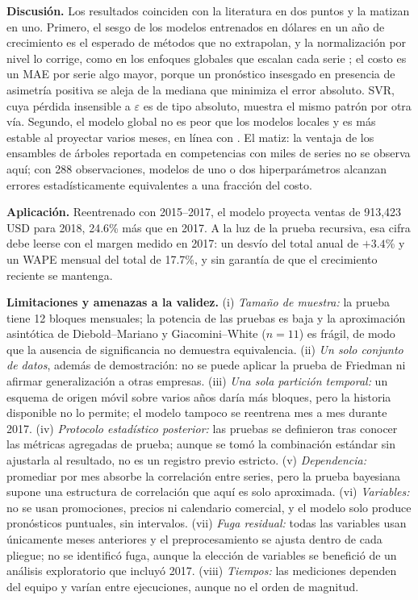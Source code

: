 \documentclass[pdflatex,sn-mathphys-num]{sn-jnl}
\begin{document}
\textbf{Discusión.} Los resultados coinciden con la literatura en dos puntos y la matizan en uno. Primero, el sesgo de los modelos entrenados en dólares en un año de crecimiento es el esperado de métodos que no extrapolan, y la normalización por nivel lo corrige, como en los enfoques globales que escalan cada serie \cite{salinas2020,smyl2020}; el costo es un MAE por serie algo mayor, porque un pronóstico insesgado en presencia de asimetría positiva se aleja de la mediana que minimiza el error absoluto. SVR, cuya pérdida insensible a $\varepsilon$ es de tipo absoluto, muestra el mismo patrón por otra vía. Segundo, el modelo global no es peor que los modelos locales y es más estable al proyectar varios meses, en línea con \cite{monteromanso2021}. El matiz: la ventaja de los ensambles de árboles reportada en competencias con miles de series \cite{makridakis2022} no se observa aquí; con 288 observaciones, modelos de uno o dos hiperparámetros alcanzan errores estadísticamente equivalentes a una fracción del costo.

\textbf{Aplicación.} Reentrenado con 2015--2017, el modelo proyecta ventas de 913{,}423 USD para 2018, 24.6\% más que en 2017. A la luz de la prueba recursiva, esa cifra debe leerse con el margen medido en 2017: un desvío del total anual de $+3.4$\% y un WAPE mensual del total de 17.7\%, y sin garantía de que el crecimiento reciente se mantenga.

\textbf{Limitaciones y amenazas a la validez.} (i) \emph{Tamaño de muestra:} la prueba tiene 12 bloques mensuales; la potencia de las pruebas es baja y la aproximación asintótica de Diebold--Mariano y Giacomini--White ($n=11$) es frágil, de modo que la ausencia de significancia no demuestra equivalencia. (ii) \emph{Un solo conjunto de datos}, además de demostración: no se puede aplicar la prueba de Friedman ni afirmar generalización a otras empresas. (iii) \emph{Una sola partición temporal:} un esquema de origen móvil sobre varios años daría más bloques, pero la historia disponible no lo permite; el modelo tampoco se reentrena mes a mes durante 2017. (iv) \emph{Protocolo estadístico posterior:} las pruebas se definieron tras conocer las métricas agregadas de prueba; aunque se tomó la combinación estándar sin ajustarla al resultado, no es un registro previo estricto. (v) \emph{Dependencia:} promediar por mes absorbe la correlación entre series, pero la prueba bayesiana supone una estructura de correlación que aquí es solo aproximada. (vi) \emph{Variables:} no se usan promociones, precios ni calendario comercial, y el modelo solo produce pronósticos puntuales, sin intervalos. (vii) \emph{Fuga residual:} todas las variables usan únicamente meses anteriores y el preprocesamiento se ajusta dentro de cada pliegue; no se identificó fuga, aunque la elección de variables se benefició de un análisis exploratorio que incluyó 2017. (viii) \emph{Tiempos:} las mediciones dependen del equipo y varían entre ejecuciones, aunque no el orden de magnitud.
\end{document}
